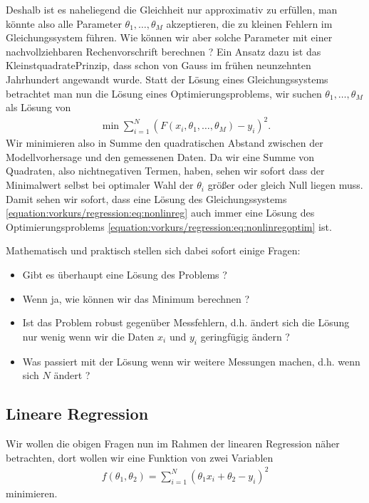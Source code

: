 \documentclass[letterpaper,10pt,english]{jupyterBook}
\begin{document}
\noindent{}

Deshalb ist es naheliegend die Gleichheit nur approximativ zu erfüllen, man könnte also alle Parameter \(\theta_1,\ldots,\theta_M\) akzeptieren, die zu kleinen Fehlern im Gleichungssystem führen. Wie können wir aber solche Parameter mit einer nachvollziehbaren Rechenvorschrift berechnen ? Ein Ansatz dazu ist das Kleinstquadrate\sphinxhyphen{}Prinzip, dass schon von Gauss im frühen neunzehnten Jahrhundert angewandt wurde. Statt der Lösung eines Gleichungssystems betrachtet man nun die Lösung eines Optimierungsproblems, wir suchen \(\theta_1,\ldots,\theta_M\) als Lösung von
\begin{equation}\label{equation:vorkurs/regression:eq:nonlinregoptim}
\begin{split}\min \sum_{i=1}^N ( F(x_i,\theta_1,\ldots,\theta_M) - y_i)^2.\end{split}
\end{equation}
Wir minimieren also in Summe den quadratischen Abstand zwischen der Modellvorhersage und den gemessenen Daten.
Da wir eine Summe von Quadraten, also nichtnegativen Termen, haben, sehen wir sofort dass der Minimalwert selbst bei optimaler Wahl der \(\theta_i\) größer oder gleich Null liegen muss. Damit sehen wir sofort, dass eine Lösung des Gleichungssystems \eqref{equation:vorkurs/regression:eq:nonlinreg} auch immer eine Lösung des Optimierungsproblems \eqref{equation:vorkurs/regression:eq:nonlinregoptim} ist.

Mathematisch und praktisch stellen sich dabei sofort einige Fragen:
\begin{itemize}
\item {} 
Gibt es überhaupt eine Lösung des Problems ?

\item {} 
Wenn ja, wie können wir das Minimum berechnen ?

\item {} 
Ist das Problem robust gegenüber Messfehlern, d.h. ändert sich die Lösung nur wenig wenn wir die Daten \(x_i\) und \(y_i\) geringfügig ändern ?

\item {} 
Was passiert mit der Lösung wenn wir weitere Messungen machen, d.h. wenn sich \(N\) ändert ?

\end{itemize}


\subsection{Lineare Regression}
\label{\detokenize{vorkurs/regression:lineare-regression}}
Wir wollen die obigen Fragen nun im Rahmen der linearen Regression näher betrachten, dort wollen wir eine Funktion von zwei Variablen
\begin{equation*}
\begin{split} f(\theta_1,\theta_2) =  \sum_{i=1}^N (\theta_1 x_i + \theta_2 -y_i)^2 \end{split}
\end{equation*}
minimieren.
\end{document}
